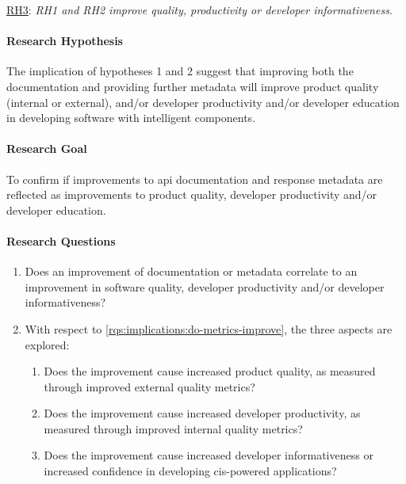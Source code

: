 \begin{titled-frame}{\underline{RH3}: \textit{RH1 and RH2 improve quality,  productivity or developer informativeness.} }
\vspace{-12pt}
\paragraph{Research Hypothesis}
The implication of hypotheses 1 and 2 suggest that improving both the documentation and providing further metadata will improve product quality (internal or external), and/or developer productivity and/or developer education in developing software with intelligent components.

\paragraph{Research Goal}
 To confirm if improvements to \gls{api} documentation and response metadata  are reflected as improvements to product quality, developer productivity and/or developer education.
 
 \paragraph{Research Questions}
\begin{enumerate}[label=\textbf{RQ3.\arabic*.}, ref=RQ3.\arabic*, leftmargin=3.5\parindent, rightmargin=1\parindent]
  \item  Does an improvement of documentation or metadata correlate to an improvement in software quality, developer productivity and/or developer informativeness?
  \label{rqs:implications:do-metrics-improve}
  
  \item With respect to \ref{rqs:implications:do-metrics-improve}, the three aspects are explored:
  \begin{enumerate}
  \item Does the improvement cause increased product quality, as measured through improved external quality metrics?
  \item Does the improvement cause increased developer productivity, as measured through improved internal quality metrics?
  \item Does the improvement cause increased developer informativeness or increased confidence in developing \gls{cis}-powered applications?
  \end{enumerate}
  \label{rqs:implications:aspects}  
\end{enumerate}


\end{titled-frame}
